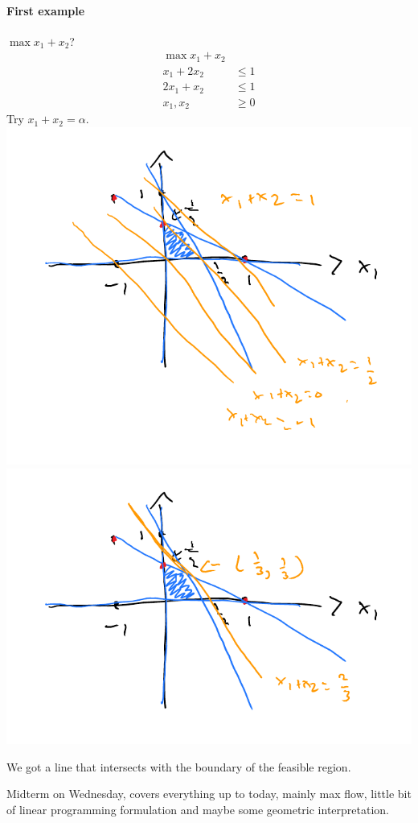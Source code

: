 \documentclass[12 pt]{article}
\begin{document}
        \paragraph{First example} $\max x_1 + x_2$?
        \begin{align*}
          \max x_1+x_2
          \\ x_1 + 2x_2  & \leq 1
          \\ 2x_1 + x_2 & \leq 1
          \\ x_1, x_2 & \geq 0
        \end{align*}
        Try $x_1 + x_2 = \alpha$.
        \\
        \includegraphics[width=.7\textwidth]{i102.pdf}
        \\ \includegraphics[width=.7\textwidth]{i103.pdf}

        We got a line that intersects with the boundary of the
        feasible region.
        
        Midterm on Wednesday, covers everything up to today, mainly
        max flow, little bit of linear programming formulation and
        maybe some geometric interpretation.
        
\end{document}
